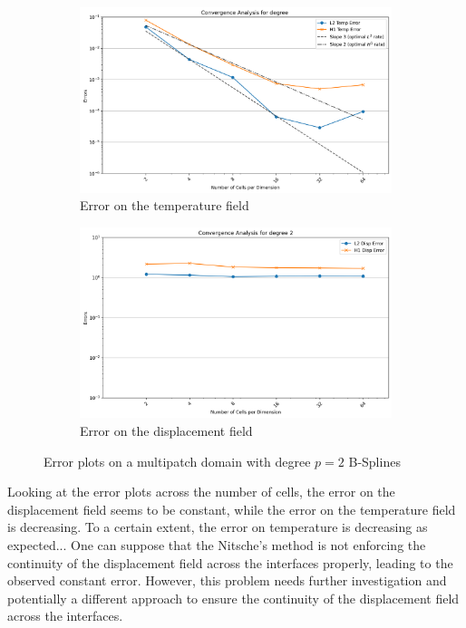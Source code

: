 \documentclass[a4paper,12pt,twoside]{report}
\begin{document}
\begin{figure}[!h]
	\centering
	\begin{subfigure}[b]{0.49\textwidth}
		\centering
		\includegraphics[width=\textwidth]{figures/figures_multipatch/Temp_multipatch.png}
		\caption{Error on the temperature field}
		\label{fig:error_temp_multipatch}
	\end{subfigure}
	\begin{subfigure}[b]{0.49\textwidth}
		\centering
		\includegraphics[width=\textwidth]{figures/figures_multipatch/Disp_multipatch.png}
		\caption{Error on the displacement field}
		\label{fig:error_disp_multipatch}
	\end{subfigure}
	\caption{Error plots on a multipatch domain with degree $p = 2$ B-Splines}
\end{figure}

Looking at the error plots across the number of cells, the error on the displacement field seems to be constant, while the error on the temperature field is decreasing. To a certain extent, the error on temperature is decreasing as expected...
One can suppose that the Nitsche's method is not enforcing the continuity of the displacement field across the interfaces properly, leading to the observed constant error. However, this problem needs further investigation and potentially a different approach to ensure the continuity of the displacement field across the interfaces.
\end{document}
